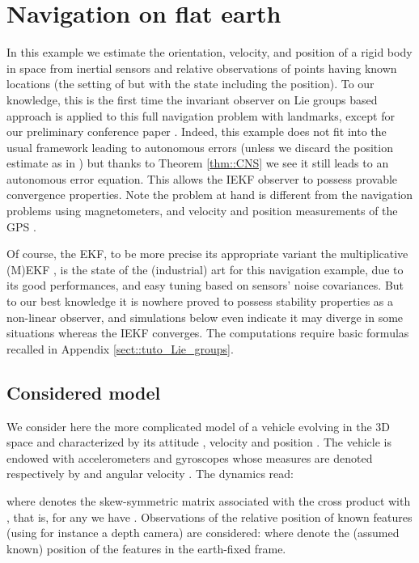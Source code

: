 \documentclass[a4paper,12pt,onecolumn]{article}
\begin{document}
\section{Navigation on flat earth}\label{sect::examples:B}

In this example we estimate the orientation, velocity, and position of a rigid body in space from inertial sensors and relative observations of points having known locations (the setting of \cite{Vasconcelos} but with the state including the position). To our knowledge, this is the first time the invariant observer on Lie groups based approach  is applied to this full navigation problem with landmarks, except for our preliminary conference paper \cite{barrau-bonnabel-cdc14}. Indeed, this example does not fit into the usual framework leading to autonomous errors (unless we discard the position estimate as in   \cite{Vasconcelos}) but thanks to Theorem \ref{thm::CNS} we see it still leads to an autonomous error equation. This allows the IEKF observer to possess provable convergence properties. Note  the problem at hand is different from the navigation problems using magnetometers, and velocity and position measurements of the GPS  \cite{hua2010attitude,grip2015globally}. 

Of course, the EKF, to be more precise its appropriate variant the multiplicative (M)EKF \cite{lefferts1982kalman}, is the state of the (industrial) art for this navigation example, due to its good  performances, and easy tuning based on sensors' noise covariances. But to our best knowledge it is nowhere proved to possess stability properties as a non-linear observer, and  simulations below even indicate  it may diverge in some situations whereas the IEKF converges. The computations require basic formulas recalled in Appendix \ref{sect::tuto_Lie_groups}. 

\subsection{Considered  model}



We consider here the  more complicated model of a vehicle evolving in the 3D space and characterized by its attitude , velocity  and position . The vehicle is endowed with accelerometers and gyroscopes whose measures are denoted respectively by  and angular velocity . The   dynamics read:

where  denotes the  skew-symmetric matrix associated with the cross product with , that is, for any  we have . 
Observations of the relative position of known features (using for instance a depth camera) are considered:
 where  denote the (assumed known) position of the features in the earth-fixed frame.
\end{document}
